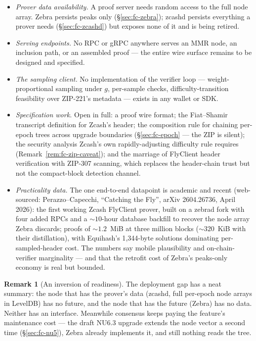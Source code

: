 \documentclass[11pt,a4paper]{article}
\theoremstyle{definition}
\newtheorem{remark}[theorem]{Remark}
\begin{document}
\begin{itemize}[leftmargin=1.4em]
\item \emph{Prover data availability.} A proof server needs random
access to the full node array. Zebra persists peaks only
(\S\ref{sec:fc-zebra}); zcashd persists everything a prover needs
(\S\ref{sec:fc-zcashd}) but exposes none of it and is being retired.
\item \emph{Serving endpoints.} No RPC or gRPC anywhere serves an MMR
node, an inclusion path, or an assembled proof --- the entire wire
surface remains to be designed and specified.
\item \emph{The sampling client.} No implementation of the verifier
loop --- weight-proportional sampling under $g$, per-sample checks,
difficulty-transition feasibility over ZIP-221's metadata --- exists in
any wallet or SDK.
\item \emph{Specification work.} Open in full: a proof wire format; the
Fiat--Shamir transcript definition for Zcash's header; the composition
rule for chaining per-epoch trees across upgrade boundaries
(\S\ref{sec:fc-epoch} --- the ZIP is silent); the security analysis
Zcash's own rapidly-adjusting difficulty rule requires
(Remark~\ref{rem:fc-zip-caveat}); and the marriage of FlyClient header
verification with ZIP-307 scanning, which replaces the header-chain
trust but not the compact-block detection channel.
\item \emph{Practicality data.} The one end-to-end datapoint is
academic and recent (web-sourced: Perazzo--Capecchi, ``Catching the
Fly'', arXiv 2604.26736, April 2026): the first working Zcash FlyClient
prover, built on a zebrad fork with four added RPCs and a
${\sim}10$-hour database backfill to recover the node array Zebra
discards; proofs of ${\sim}1.2$~MiB at three million blocks
(${\sim}320$~KiB with their distillation), with Equihash's 1{,}344-byte
solutions dominating per-sampled-header cost. The numbers say mobile
plausibility and on-chain-verifier marginality --- and that the
retrofit cost of Zebra's peaks-only economy is real but bounded.
\end{itemize}

\begin{remark}[An inversion of readiness]\label{rem:fc-inversion}
The deployment gap has a neat summary: the node that has the prover's
data (zcashd, full per-epoch node arrays in LevelDB) has no future, and
the node that has the future (Zebra) has no data. Neither has an
interface. Meanwhile consensus keeps paying the feature's maintenance
cost --- the draft NU6.3 upgrade extends the node vector a second time
(\S\ref{sec:fc-nu5}), Zebra already implements it, and still nothing
reads the tree.
\end{remark}
\end{document}
